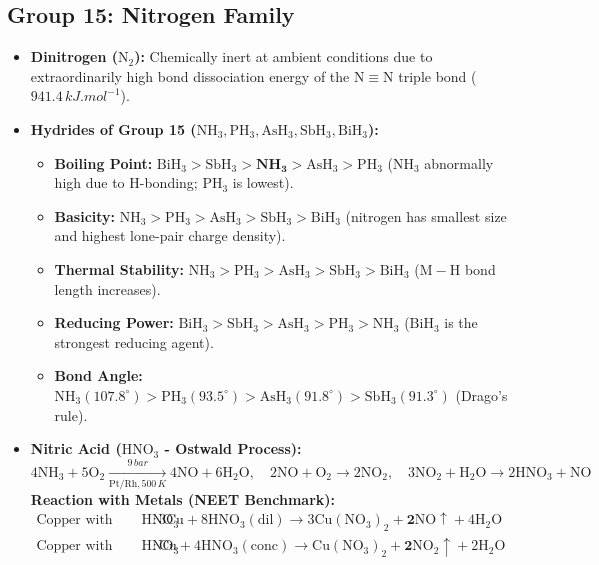 \documentclass[10pt,a4paper]{article}
\begin{document}
\subsection{Group 15: Nitrogen Family}
\begin{itemize}
  \item \textbf{Dinitrogen ($\mathrm{N_2}$):} Chemically inert at ambient conditions due to extraordinarily high bond dissociation energy of the $\mathrm{N\equiv N}$ triple bond ($941.4\,\si{kJ.mol^{-1}}$).
  \item \textbf{Hydrides of Group 15 ($\mathrm{NH_3, PH_3, AsH_3, SbH_3, BiH_3}$):}
  \begin{itemize}
    \item \textbf{Boiling Point:} $\mathrm{BiH_3 > SbH_3 > \mathbf{NH_3} > AsH_3 > PH_3}$ ($\mathrm{NH_3}$ abnormally high due to H-bonding; $\mathrm{PH_3}$ is lowest).
    \item \textbf{Basicity:} $\mathrm{NH_3 > PH_3 > AsH_3 > SbH_3 > BiH_3}$ (nitrogen has smallest size and highest lone-pair charge density).
    \item \textbf{Thermal Stability:} $\mathrm{NH_3 > PH_3 > AsH_3 > SbH_3 > BiH_3}$ ($\mathrm{M-H}$ bond length increases).
    \item \textbf{Reducing Power:} $\mathrm{BiH_3 > SbH_3 > AsH_3 > PH_3 > NH_3}$ ($\mathrm{BiH_3}$ is the strongest reducing agent).
    \item \textbf{Bond Angle:} $\mathrm{NH_3 (107.8^\circ) > PH_3 (93.5^\circ) > AsH_3 (91.8^\circ) > SbH_3 (91.3^\circ)}$ (Drago's rule).
  \end{itemize}
  \item \textbf{Nitric Acid ($\mathrm{HNO_3}$ - Ostwald Process):}
  \begin{equation}
    4\mathrm{NH_3} + 5\mathrm{O_2} \xrightarrow[\mathrm{Pt/Rh}, 500\,\si{K}]{9\,\si{bar}} 4\mathrm{NO} + 6\mathrm{H_2O}, \quad 2\mathrm{NO} + \mathrm{O_2} \to 2\mathrm{NO_2}, \quad 3\mathrm{NO_2} + \mathrm{H_2O} \to 2\mathrm{HNO_3} + \mathrm{NO}
  \end{equation}
  \textbf{Reaction with Metals (NEET Benchmark):}
  \begin{align}
    \text{Copper with Dilute } \mathrm{HNO_3} &: 3\mathrm{Cu} + 8\mathrm{HNO_3(dil)} \longrightarrow 3\mathrm{Cu(NO_3)_2} + \mathbf{2\mathrm{NO\uparrow}} + 4\mathrm{H_2O} \\
    \text{Copper with Conc. } \mathrm{HNO_3} &: \mathrm{Cu} + 4\mathrm{HNO_3(conc)} \longrightarrow \mathrm{Cu(NO_3)_2} + \mathbf{2\mathrm{NO_2\uparrow}} + 2\mathrm{H_2O} \\

\end{align}
\end{itemize}
\end{document}
